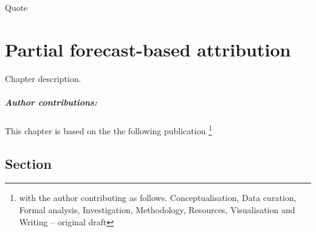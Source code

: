 \begin{savequote}[8cm]
    Quote
\end{savequote}
    
\chapter{\label{ch3}Partial forecast-based attribution} 

Chapter description.
\small\paragraph{Author contributions:} This chapter is based on the the following publication \footnote{with the author contributing as follows. Conceptualisation, Data curation, Formal analysis, Investigation, Methodology, Resources, Visualisation and Writing -- original draft} \par\vspace{1em}

\minitoc

\clearpage

\section{Section}

    \blindtext